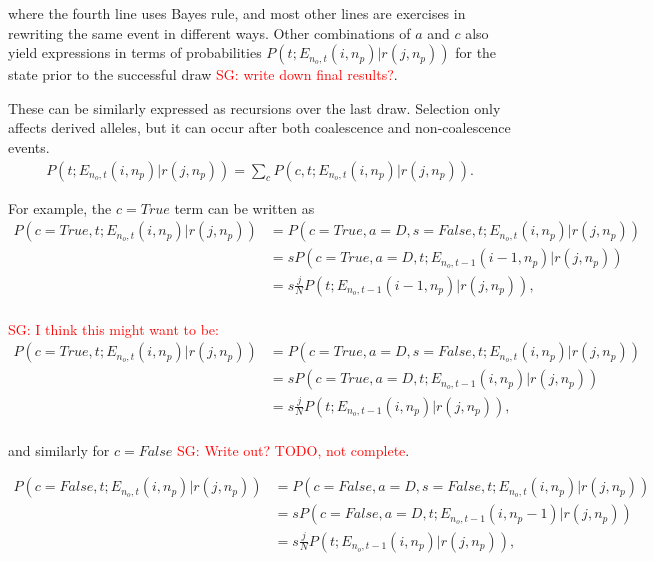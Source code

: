 \documentclass[review]{elsarticle}
\newcommand{\sgcomment}[1]{\textcolor{red}{SG: #1}}
\begin{document}
where the fourth line uses Bayes rule, and  most other lines are exercises in rewriting the same event in different ways. 
Other combinations of $a$ and $c$ also yield expressions in terms of probabilities $P(t;  E_{n_o,t}(i,n_p) | r(j, n_p))$ for the state prior to the successful draw \sgcomment{write down final results?}. 


These can be similarly expressed as recursions over the last draw. Selection only affects derived alleles, but it can occur after both coalescence and non-coalescence events. 
\begin{equation}
\begin{split}
P(t;  E_{n_o,t}(i,n_p) | r(j, n_p)) = \sum_c P(c, t;  E_{n_o,t}(i,n_p) | r(j, n_p)).
\end{split}
\end{equation}

For example, the $c = True$ term can be written as 
 \begin{equation}
\begin{split}
P(c=True, t;  E_{n_o,t}(i,n_p) | r(j, n_p)) &= P(c=True, a=D, s=False, t;  E_{n_o,t}(i,n_p) | r(j, n_p))\\
&= s P(c=True, a=D, t;  E_{n_o,t-1}(i-1,n_p) | r(j, n_p))\\
&= s \frac{j}{N} P( t;  E_{n_o,t-1}(i-1,n_p) | r(j, n_p)),\\
\end{split}
\end{equation}

\sgcomment{I think this might want to be: }
 \begin{equation}
\begin{split}
P(c=True, t;  E_{n_o,t}(i,n_p) | r(j, n_p)) &= P(c=True, a=D, s=False, t;  E_{n_o,t}(i,n_p) | r(j, n_p))\\
&= s P(c=True, a=D, t;  E_{n_o,t-1}(i,n_p) | r(j, n_p))\\
&= s \frac{j}{N} P( t;  E_{n_o,t-1}(i,n_p) | r(j, n_p)),\\
\end{split}
\end{equation}


and similarly for $c=False$ \sgcomment{Write out? TODO, not complete}.  

 \begin{equation}
\begin{split}
P(c=False, t;  E_{n_o,t}(i,n_p) | r(j, n_p)) &= P(c=False, a=D, s=False, t;  E_{n_o,t}(i,n_p) | r(j, n_p))\\
&= s P(c=False, a=D, t;  E_{n_o,t-1}(i,n_p-1) | r(j, n_p))\\
&= s \frac{j}{N} P( t;  E_{n_o,t-1}(i,n_p) | r(j, n_p)),\\
\end{split}
\end{equation}
\end{document}
